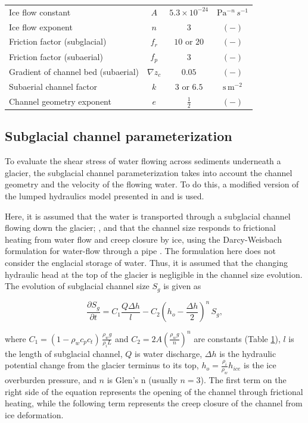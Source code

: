 \documentclass[11pt]{article}
\newcommand{\unit}[1]{$\mathrm{#1}$}
\begin{document}
\begin{table}[ht]
\begin{tabular}{ l  c  c c }
    Ice flow constant &$A$& $5.3\times10^{-24}$ &\unit{Pa}$^{-n}$\,$s^{-1}$\\
    Ice flow exponent &$n$& $3$ &$\mathrm{(-)}$\\
    Friction factor (subglacial) & $f_r$ &$10$ or $20$ & $\mathrm{(-)}$ \\
    Friction factor (subaerial) & $f_p$ & $3$ & $\mathrm{(-)}$\\
    Gradient of channel bed (subaerial) &$\nabla z_c$ &$0.05$& $\mathrm{(-)}$\\
    Subaerial channel factor & $k$ &$3$ or $6.5$ & $\mathrm{s\,m^{-2}}$\\
    Channel geometry exponent &$e$& $\frac{1}{2}$&$\mathrm{(-)}$ \\
    \hline
  \end{tabular}
  \label{table:vpm}


\end{table}

\subsection{Subglacial channel  parameterization}
\label{sect:sub_mode}

To evaluate the shear stress of water flowing across sediments underneath a glacier, the subglacial channel parameterization takes into account the channel geometry and the velocity of the flowing water.
To do this, a modified version of the lumped hydraulics model presented in \citet{clarke1996} and \citet{werder2010} is used.

Here, it is assumed that the water is transported through a subglacial channel flowing down the glacier; \citep[Figure~\ref{fig:cartoon}; ][]{rothlisberger1972}, and that the channel  size responds to frictional heating from water flow and creep closure by ice, using the Darcy-Weisbach formulation for water-flow through a pipe  \citep[e.g.][]{rothlisberger1972,clarke2003}.
The formulation here does not consider the englacial storage of water.
Thus, it is assumed that the changing hydraulic head at the top of the glacier is negligible in the channel size evolution.
The evolution of subglacial channel size $S_g$ is given as
\begin{linenomath*}
  \begin{equation}
    \label{eq:dS_dt}
    \frac{\partial S_g}{\partial t} = C_1 \frac{Q \Delta h}{l} - C_2 \left(h_{o}-\frac{\Delta h}{2}\right)^n\,S_g,
  \end{equation}
\end{linenomath*}
\noindent where $C_1= (1-\rho_wc_pc_t)\,\frac{\rho_wg}{\rho_iL}$ and $C_2=2A(\frac{\rho_wg}{n})^n$ are constants (Table \ref{table:vpm}), $l$ is the length of subglacial channel, $Q$ is water discharge, $\Delta h$ is the hydraulic potential change from the glacier terminus to its top, $h_{o}= \frac{\rho_i}{\rho_w} h_{ice}$ is the ice overburden pressure, and $n$ is Glen's n \citep{glen1955} (usually $n=3$).
The first term on the right side of the equation represents the opening of the channel through frictional heating, while the following term represents the creep closure of the channel from ice deformation.
\end{document}
